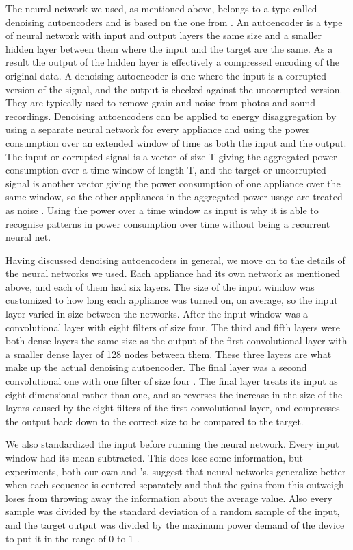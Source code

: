 \documentclass{article}
\begin{document}
The neural network we used, as mentioned above, belongs to a type called denoising autoencoders and is based on the one from \cite{Kelly}. An autoencoder is a type of neural network with input and output layers the same size and a smaller hidden layer between them where the input and the target are the same. As a result the output of the hidden layer is effectively a compressed encoding of the original data. A denoising autoencoder is one where the input is a corrupted version of the signal, and the output is checked against the uncorrupted version. They are typically used to remove grain and noise from photos and sound recordings. 
Denoising autoencoders can be applied to energy disaggregation by using a separate neural network for every appliance and using the power consumption over an extended window of time as both the input and the output. The input or corrupted signal is a vector of size T giving the aggregated power consumption over a time window of length T, and the target or uncorrupted signal is another vector giving the power consumption of one appliance over the same window, so the other appliances in the aggregated power usage are treated as noise \cite{Kelly}. Using the power over a time window as input is why it is able to recognise patterns in power consumption over time without being a recurrent neural net.

Having discussed denoising autoencoders in general, we move on to the details of the neural networks we used. Each appliance had its own network as mentioned above, and each of them had six layers. The size of the input window was customized to how long each appliance was turned on, on average, so the input layer varied in size between the networks. After the input window was a convolutional layer with eight filters of size four. The third and fifth layers were both dense layers the same size as the output of the first convolutional layer with a smaller dense layer of 128 nodes between them. These three layers are what make up the actual denoising autoencoder. The final layer was a second convolutional one with one filter of size four \cite{Kelly}. The final layer treats its input as eight dimensional rather than one, and so reverses the increase in the size of the layers caused by the eight filters of the first convolutional layer, and compresses the output back down to the correct size to be compared to the target.

We also standardized the input before running the neural network. Every input window had its mean subtracted. This does lose some information, but experiments, both our own and \cite{Kelly}'s, suggest that neural networks generalize better when each sequence is centered separately and that the gains from this outweigh loses from throwing away the information about the average value. Also every sample was divided by the standard deviation of a random sample of the input, and the target output was divided by the maximum power demand of the device to put it in the range of 0 to 1 \cite{Kelly}. 
\end{document}
